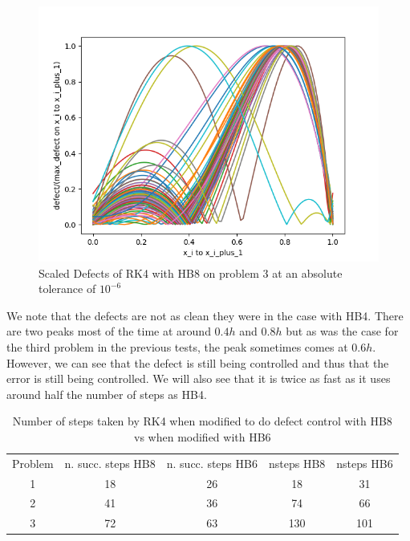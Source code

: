 \documentclass{article}
\begin{document}
\begin{figure}[H]
\centering
\includegraphics[width=0.7\linewidth]{./figures/rk4_with_hb8_p3_scaled_defects}
\caption{Scaled Defects of RK4 with HB8 on problem 3 at an absolute tolerance of $10^{-6}$}
\label{fig:rk4_with_hb8_p3_scaled_defects}
\end{figure}

We note that the defects are not as clean they were in the case with HB4. There are two peaks most of the time at around $0.4h$ and $0.8h$ but as was the case for the third problem in the previous tests, the peak sometimes comes at $0.6h$. However, we can see that the defect is still being controlled and thus that the error is still being controlled. We will also see that it is twice as fast as it uses around half the number of steps as HB4.

\begin{table}[h]
\caption {Number of steps taken by RK4 when modified to do defect control with HB8 vs when modified with HB6} \label{tab:rk4_with_hb8_nsteps}
\begin{center}
\begin{tabular}{ c c c c c } 
Problem & n. succ. steps HB8 & n. succ. steps HB6 & nsteps HB8 & nsteps HB6 \\ 
1       & 18                 &        26          & 18         & 31\\ 
2       & 41                 &        36          & 74         & 66\\
3       & 72                 &        63          & 130        & 101\\
\end{tabular}
\end{center}
\end{table}
\end{document}
